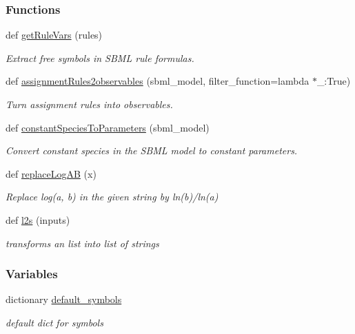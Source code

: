 \subsubsection*{Functions}
\begin{DoxyCompactItemize}
\item 
def \mbox{\hyperlink{namespaceamici_1_1sbml__import_a64a5d0187cb4b3f69bceceb7d5638691}{get\+Rule\+Vars}} (rules)
\begin{DoxyCompactList}\small\item\em Extract free symbols in S\+B\+ML rule formulas. \end{DoxyCompactList}\item 
def \mbox{\hyperlink{namespaceamici_1_1sbml__import_aaba72ac8b7d363e7720f36495ccc3285}{assignment\+Rules2observables}} (sbml\+\_\+model, filter\+\_\+function=lambda $\ast$\+\_\+\+:\+True)
\begin{DoxyCompactList}\small\item\em Turn assignment rules into observables. \end{DoxyCompactList}\item 
def \mbox{\hyperlink{namespaceamici_1_1sbml__import_a9cee719122a45a0ac8590514a19ed5cc}{constant\+Species\+To\+Parameters}} (sbml\+\_\+model)
\begin{DoxyCompactList}\small\item\em Convert constant species in the S\+B\+ML model to constant parameters. \end{DoxyCompactList}\item 
def \mbox{\hyperlink{namespaceamici_1_1sbml__import_a178c633ce1bc7f2af378ce56bd404541}{replace\+Log\+AB}} (x)
\begin{DoxyCompactList}\small\item\em Replace log(a, b) in the given string by ln(b)/ln(a) \end{DoxyCompactList}\item 
def \mbox{\hyperlink{namespaceamici_1_1sbml__import_a6bff3fedaa877c35e5ea7bc112ec4adf}{l2s}} (inputs)
\begin{DoxyCompactList}\small\item\em transforms an list into list of strings \end{DoxyCompactList}\end{DoxyCompactItemize}
\subsubsection*{Variables}
\begin{DoxyCompactItemize}
\item 
dictionary \mbox{\hyperlink{namespaceamici_1_1sbml__import_abfb00dffe8d5c524c2916febc9b3810b}{default\+\_\+symbols}}
\begin{DoxyCompactList}\small\item\em default dict for symbols \end{DoxyCompactList}\end{DoxyCompactItemize}



